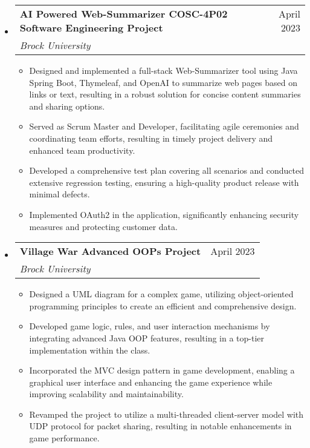\documentclass[letterpaper,11pt]{article}
\makeatletter
\newcommand{\resumeItem}[1]{
  \item\small{
    {#1 \vspace{-2pt}}
  }
}
\newcommand{\resumeSubheading}[4]{
  \vspace{-2pt}\item
    \begin{tabular*}{0.97\textwidth}[t]{l@{\extracolsep{\fill}}r}
      \textbf{#1} & #2 \\
      \textit{\small#3} & \textit{\small #4} \\
    \end{tabular*}\vspace{-7pt}
}
\newcommand{\resumeSubHeadingListStart}{\begin{itemize}[leftmargin=0.15in, label={}]}
\newcommand{\resumeSubHeadingListEnd}{\end{itemize}}
\newcommand{\resumeItemListStart}{\begin{itemize}}
\newcommand{\resumeItemListEnd}{\end{itemize}\vspace{-5pt}}
\makeatother
\begin{document}
\begin{center}
\resumeSubHeadingListStart
  \resumeSubheading
    {AI Powered Web-Summarizer COSC-4P02 Software Engineering Project}{April 2023}
    {Brock University}{}
    \resumeItemListStart
    \resumeItem{Designed and implemented a full-stack Web-Summarizer tool using Java Spring Boot, Thymeleaf, and OpenAI to summarize web pages based on links or text, resulting in a robust solution for concise content summaries and sharing options.}
      \resumeItem{Served as Scrum Master and Developer, facilitating agile ceremonies and coordinating team efforts, resulting in timely project delivery and enhanced team productivity.}
      \resumeItem{Developed a comprehensive test plan covering all scenarios and conducted extensive regression testing, ensuring a high-quality product release with minimal defects.}
      \resumeItem{Implemented OAuth2 in the application, significantly enhancing security measures and protecting customer data.}
    \resumeItemListEnd
\resumeSubHeadingListEnd

\resumeSubHeadingListStart
  \resumeSubheading
    {Village War Advanced OOPs Project}{April 2023}
    {Brock University}{}
    \resumeItemListStart
      \resumeItem{Designed a UML diagram for a complex game, utilizing object-oriented programming principles to create an efficient and comprehensive design.}
      \resumeItem{Developed game logic, rules, and user interaction mechanisms by integrating advanced Java OOP features, resulting in a top-tier implementation within the class.}
      \resumeItem{Incorporated the MVC design pattern in game development, enabling a graphical user interface and enhancing the game experience while improving scalability and maintainability.}
      \resumeItem{Revamped the project to utilize a multi-threaded client-server model with UDP protocol for packet sharing, resulting in notable enhancements in game performance.}
    \resumeItemListEnd
\resumeSubHeadingListEnd
\end{center}
\end{document}
